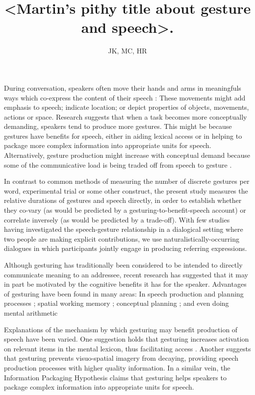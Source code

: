 \documentclass[a4paper,man,natbib]{apa6}
\title{<Martin's pithy title about gesture and speech>.}
\author{JK, MC, HR}
\affiliation{Psychology, PPLS, University of Edinburgh}
\begin{document}
\maketitle


\noindent
During conversation, speakers often move their hands and arms in meaningfuls ways which co-express the content of their speech \citep{McNeill1992}:%
These movements might add emphasis to speech; indicate location; or depict properties of objects, movements, actions or space.
Research suggests that when a task becomes more conceptually demanding, speakers tend to produce more gestures.
This might be because gestures have benefits for speech, either in aiding lexical access \citep{Rauscher1996, Krauss2000} or in helping to package more complex information into appropriate units for speech\citep{Kita2000}.
Alternatively, gesture production might increase with conceptual demand because some of the communicative load is being traded off from speech to gesture \citep{Melinger2004, Bangerter2004, DeRuiter2006}.

In contrast to common methods of measuring the number of discrete gestures per word, experimental trial or some other construct, the present study measures the relative durations of gestures and speech directly, in order to establish whether they co-vary (as would be predicted by a gesturing-to-benefit-speech account) or correlate inversely (as would be predicted by a trade-off).
With few studies having investigated the speech-gesture relationship in a dialogical setting where two people are making explicit contributions, we use naturalistically-occurring dialogues in which participants jointly engage in producing referring expressions.

Although gesturing has traditionally been considered to be intended to directly communicate meaning to an addressee, recent research has suggested that it may in part be motivated by the cognitive benefits it has for the speaker.
Advantages of gesturing have been found in many areas: In speech production and planning processes \citep{Rauscher1996, Krauss1999, Rose2001, Morsella2004, Kita2000}; spatial working memory \citep{Wesp2001, Morsella2004}; conceptual planning \citep{Melinger2007}; and even doing mental arithmetic \citep{Goldin-Meadow2001}

Explanations of the mechanism by which gesturing may benefit production of speech have been varied. 
One suggestion holds that gesturing increases activation on relevant items in the mental lexicon, thus facilitating access \citep{Krauss2000}. Another \citep{Hadar1997} suggests that gesturing prevents visuo-spatial imagery from decaying, providing speech production processes with higher quality information. In a similar vein, the Information Packaging Hypothesis \citep{Kita2000, Kita2003} claims that gesturing helps speakers to package complex information into appropriate units for speech. 
\end{document}

